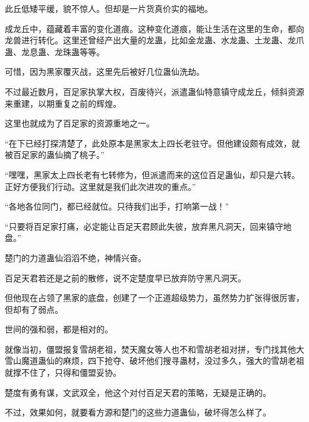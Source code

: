 \begin{this_body}
此丘低矮平缓，貌不惊人。但却是一片货真价实的福地。

成龙丘中，蕴藏着丰富的变化道痕。这种变化道痕，能让生活在这里的生命，都向龙兽进行转化。这里还曾经产出大量的龙蛊，比如金龙蛊、水龙蛊、土龙蛊、龙爪蛊、龙息蛊、龙珠蛊等等。

可惜，因为黑家覆灭战，这里先后被好几位蛊仙洗劫。

不过最近数月，百足家执掌大权，百废待兴，派遣蛊仙特意镇守成龙丘，倾斜资源来重建，以期重复之前的辉煌。

这里也就成为了百足家的资源重地之一。

“在下已经打探清楚了，此处原本是黑家太上四长老驻守。但他建设颇有成效，就被百足家的蛊仙摘了桃子。”

“嘿嘿，黑家太上四长老有七转修为，但派遣而来的这位百足蛊仙，却只是六转。正好方便我们行动。这里就是我们此次进攻的重点。”

“各地各位同门，都已经就位。只待我们出手，打响第一战！”

“只要将百足家打痛，必定能让百足天君顾此失彼，放弃黑凡洞天，回来镇守地盘。”

楚门的力道蛊仙滔滔不绝，神情兴奋。

百足天君若还是之前的散修，说不定楚度早已放弃防守黑凡洞天。

但他现在占领了黑家的底盘，创建了一个正道超级势力，虽然势力扩张得很厉害，但却有了弱点。

世间的强和弱，都是相对的。

就像当初，僵盟报复雪胡老祖，焚天魔女等人也不和雪胡老祖对拼，专门找其他大雪山魔道蛊仙的麻烦，四下抢夺、破坏他们搜寻蛊材，没过多久，强大的雪胡老祖就撑不住了，只得和僵盟妥协。

楚度有勇有谋，文武双全，他这个对付百足天君的策略，无疑是正确的。

不过，效果如何，就要看方源和楚门的这些力道蛊仙，破坏得怎么样了。

\end{this_body}

